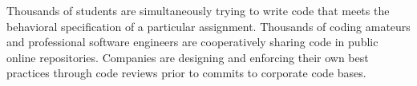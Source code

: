  Thousands of students are simultaneously trying to write code that meets the behavioral specification of a particular assignment. Thousands of coding amateurs and professional software engineers are cooperatively sharing code in public online repositories. Companies are designing and enforcing their own best practices through code reviews prior to commits to corporate code bases.

\begin{comment}
\subsection{Variation Theory}
Marton's Variation Theory, as summarized by Suhonen et al. \cite{suhonen}, is defined by the dimensions of variation necessary to fully communicate a concept to a student: \emph{contrast} (``in order to experience something, a person must experience something else to compare it with''); \emph{generalization}, or the ways something can vary without becoming something else; \emph{separation}, or looking at the variation only across specific features; and \emph{fusion}, where multiple critical aspects of the concept are varied simultaneously. In other words, variation reveals which aspects of a phenomenon are superficial/irrelevant and which are innate/critical to its definition \cite{Leung}. These aspects that define the object or concept are called ``critical features.'' The Variation Theory is a framework that now guides the design of some critical reading exercises \cite{Tong} and exercises for novice programmers \cite{eckerdal}. 
\end{comment}

